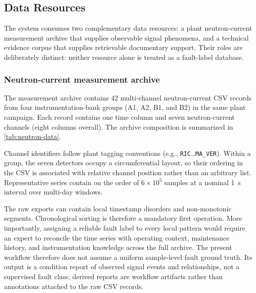 \subsection{Data Resources}
\label{sec:data}

The system consumes two complementary data resources: a plant neutron-current measurement archive that supplies observable signal phenomena, and a technical evidence corpus that supplies retrievable documentary support. Their roles are deliberately distinct: neither resource alone is treated as a fault-label database.

\subsubsection{Neutron-current measurement archive}
The measurement archive contains 42 multi-channel neutron-current CSV records from four instrumentation-bank groups (A1, A2, B1, and B2) in the same plant campaign. Each record contains one time column and seven neutron-current channels (eight columns overall). The archive composition is summarized in \cref{tab:neutron-data}.

\begin{table}[H]
  \centering
  \caption{Composition of the neutron-current measurement archive.}
  \label{tab:neutron-data}
  \small
\end{table}

Channel identifiers follow plant tagging conventions (e.g., \texttt{RIC}\ldots\texttt{MA\_VER}). Within a group, the seven detectors occupy a circumferential layout, so their ordering in the CSV is associated with relative channel position rather than an arbitrary list. Representative series contain on the order of $6\times10^{5}$ samples at a nominal \SI{1}{\second} interval over multi-day windows.

The raw exports can contain local timestamp disorders and non-monotonic segments. Chronological sorting is therefore a mandatory first operation. More importantly, assigning a reliable fault label to every local pattern would require an expert to reconcile the time series with operating context, maintenance history, and instrumentation knowledge across the full archive. The present workflow therefore does not assume a uniform sample-level fault ground truth. Its output is a condition report of observed signal events and relationships, not a supervised fault class; derived reports are workflow artifacts rather than annotations attached to the raw CSV records.

